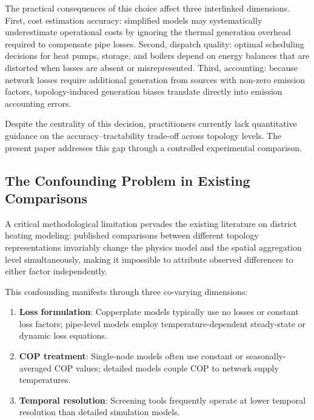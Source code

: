 \documentclass[review,3p]{elsarticle}
\begin{document}
The practical consequences of this choice affect three
interlinked dimensions. First, cost estimation accuracy: simplified
models may systematically underestimate operational costs by
ignoring the thermal generation overhead required to compensate
pipe losses. Second, dispatch quality: optimal scheduling decisions
for heat pumps, storage, and boilers depend on energy balances that
are distorted when losses are absent or misrepresented. Third,
 accounting: because network losses require additional
generation from sources with non-zero emission factors,
topology-induced generation biases translate directly into
emission accounting errors.

Despite the centrality of this decision, practitioners currently
lack quantitative guidance on the accuracy--tractability trade-off
across topology levels. The present paper addresses this gap
through a controlled experimental comparison.

\subsection{The Confounding Problem in Existing Comparisons}
\label{sec:confounding}

A critical methodological limitation pervades the existing literature
on district heating modeling: published comparisons between different
topology representations invariably change the physics model and the
spatial aggregation level simultaneously, making it impossible to
attribute observed differences to either factor independently.

This confounding manifests through three co-varying dimensions:

\begin{enumerate}
    \item \textbf{Loss formulation}: Copperplate models typically use
    no losses or constant loss factors; pipe-level models employ
    temperature-dependent steady-state or dynamic loss equations.

    \item \textbf{COP treatment}: Single-node models often use
    constant or seasonally-averaged COP values; detailed models
    couple COP to network supply temperatures.

    \item \textbf{Temporal resolution}: Screening tools frequently
    operate at lower temporal resolution than detailed simulation
    models.
\end{enumerate}
\end{document}

